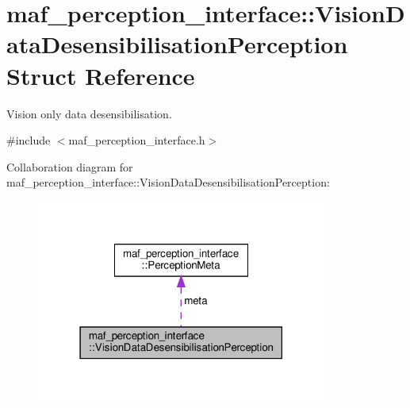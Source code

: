 \hypertarget{structmaf__perception__interface_1_1VisionDataDesensibilisationPerception}{}\section{maf\+\_\+perception\+\_\+interface\+:\+:Vision\+Data\+Desensibilisation\+Perception Struct Reference}
\label{structmaf__perception__interface_1_1VisionDataDesensibilisationPerception}


Vision only data desensibilisation.  




{\ttfamily \#include $<$maf\+\_\+perception\+\_\+interface.\+h$>$}



Collaboration diagram for maf\+\_\+perception\+\_\+interface\+:\+:Vision\+Data\+Desensibilisation\+Perception\+:\nopagebreak
\begin{figure}[H]
\begin{center}
\leavevmode
\includegraphics[width=271pt]{structmaf__perception__interface_1_1VisionDataDesensibilisationPerception__coll__graph}
\end{center}
\end{figure}
